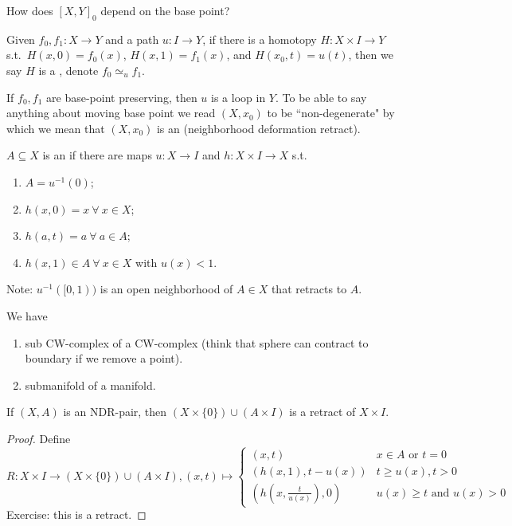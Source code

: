 \documentclass[12pt,class=article,crop=false]{standalone}
\begin{document}
How does $ [X, Y]_0$ depend on the base point?
\begin{defn}
Given $ f_0, f_1: X \to Y$ and a path $ u : I \to Y$, if there is a homotopy $ H: X \times I \to Y$ s.t.\ $ H(x,0) = f_0(x)$, $ H(x,1) = f_1(x)$, and $ H(x_0,t) = u(t)$, then we say $ H$ is a  , denote $ f_0 \simeq_u f_1$. 
\end{defn}

If $ f_0, f_1$ are base-point preserving, then $ u$ is a loop in  $ Y$. To be able to say anything about moving base point we read  $ (X,x_0)$ to be ``non-degenerate" by which we mean that  $ (X,x_0)$ is an  (neighborhood deformation retract).

\begin{defn}
$ A \subseteq X$ is an  if there are maps $ u: X \to I$ and $ h:X \times I \to X$ s.t.\
\begin{enumerate}[label=(\arabic*)]
	\item $ A= u ^{-1}(0)$;
	\item $ h(x,0) = x \ \forall \ x \in X$;
	\item $ h(a,t) = a \ \forall \ a \in A$;
	\item $ h(x,1) \in A \ \forall \ x \in X$ with $ u(x)<1$.
\end{enumerate}
\end{defn}
Note: $ u^{-1}([0,1))$ is an open neighborhood of $ A \in X$ that retracts to $ A$.

\begin{eg}
We have
\begin{enumerate}[label=(\arabic*)]
	\item sub CW-complex of a CW-complex (think that sphere can contract to boundary if we remove a point).
	\item submanifold of a manifold.
\end{enumerate}
\end{eg}

\begin{lem}
If $ (X,A)$ is an NDR-pair, then  $ (X \times \{0\}) \cup  (A \times I) $ is a retract of $ X \times I$.
\end{lem}

\begin{proof}
Define $ R: X \times I \to (X \times \{0\}) \cup (A \times I), (x,t) \mapsto \begin{cases}
	(x,t) & x \in A \text{ or } t=0\\
	(h(x,1),t - u(x) ) & t \geq u(x), t>0\\
	(h(x,\frac{t}{u(x)}),0) & u(x) \geq t \text{ and } u(x)>0 
\end{cases} $
Exercise: this is a retract.
\end{proof}
\end{document}
